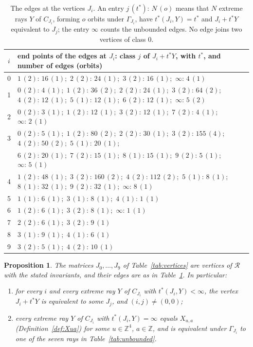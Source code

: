 \documentclass[11pt,reqno]{amsart}
\renewcommand{\_}{\origunderscore\allowbreak}
\numberwithin{equation}{section}
\theoremstyle{plain}
\newtheorem{prop}[thm]{Proposition}
\theoremstyle{definition}
\theoremstyle{remark}
\newcommand{\Z}{\mathbb{Z}}
\newcommand{\Rk}{\mathcal{R}}
\begin{document}
\begin{table}[t]
\centering
\small
\renewcommand{\arraystretch}{1.2}
\begin{tabular}{@{}c l@{}}
\toprule
$i$ & end points of the edges at $J_i$: class $j$ of $J_i+t^*Y$, with $t^*$, and number of edges (orbits)\\
\midrule
0 & $1\,(2){:}\,16\,(1)$;\ $2\,(2){:}\,24\,(1)$;\ $3\,(2){:}\,16\,(1)$;\ $\infty{:}\,4\,(1)$\\
1 & $0\,(2){:}\,4\,(1)$;\ $1\,(2){:}\,36\,(2)$;\ $2\,(2){:}\,24\,(1)$;\ $3\,(2){:}\,64\,(2)$;\ $4\,(2){:}\,12\,(1)$;\ $5\,(1){:}\,12\,(1)$;\ $6\,(2){:}\,12\,(1)$;\ $\infty{:}\,5\,(2)$\\
2 & $0\,(2){:}\,3\,(1)$;\ $1\,(2){:}\,12\,(1)$;\ $3\,(2){:}\,12\,(1)$;\ $7\,(2){:}\,4\,(1)$;\ $\infty{:}\,2\,(1)$\\
3 & $0\,(2){:}\,5\,(1)$;\ $1\,(2){:}\,80\,(2)$;\ $2\,(2){:}\,30\,(1)$;\ $3\,(2){:}\,155\,(4)$;\ $4\,(2){:}\,50\,(2)$;\ $5\,(1){:}\,20\,(1)$;\\
  & $6\,(2){:}\,20\,(1)$;\ $7\,(2){:}\,15\,(1)$;\ $8\,(1){:}\,15\,(1)$;\ $9\,(2){:}\,5\,(1)$;\ $\infty{:}\,5\,(1)$\\
4 & $1\,(2){:}\,48\,(1)$;\ $3\,(2){:}\,160\,(2)$;\ $4\,(2){:}\,112\,(2)$;\ $5\,(1){:}\,8\,(1)$;\ $8\,(1){:}\,32\,(1)$;\ $9\,(2){:}\,32\,(1)$;\ $\infty{:}\,8\,(1)$\\
5 & $1\,(1){:}\,6\,(1)$;\ $3\,(1){:}\,8\,(1)$;\ $4\,(1){:}\,1\,(1)$\\
6 & $1\,(2){:}\,6\,(1)$;\ $3\,(2){:}\,8\,(1)$;\ $\infty{:}\,1\,(1)$\\
7 & $2\,(2){:}\,6\,(1)$;\ $3\,(2){:}\,9\,(1)$\\
8 & $3\,(1){:}\,9\,(1)$;\ $4\,(1){:}\,6\,(1)$\\
9 & $3\,(2){:}\,5\,(1)$;\ $4\,(2){:}\,10\,(1)$\\
\bottomrule
\end{tabular}
\caption{The edges at the vertices $J_i$. An entry $j\,(t^*){:}\,N\,(o)$ means that $N$ extreme rays $Y$ of $C_{J_i}$, forming $o$ orbits under $\Gamma_{J_i}$, have $t^*(J_i,Y)=t^*$ and $J_i+t^*Y$ equivalent to $J_j$; the entry $\infty$ counts the unbounded edges. No edge joins two vertices of class $0$.}
\label{tab:edges}
\end{table}

\begin{prop}\label{prop:computation}
The matrices $J_0,\dots,J_9$ of Table~\ref{tab:vertices} are vertices of $\Rk$ with the stated invariants, and their edges are as in Table~\ref{tab:edges}. In particular:
\begin{enumerate}
\item for every $i$ and every extreme ray $Y$ of $C_{J_i}$ with $t^*(J_i,Y)<\infty$, the vertex $J_i+t^*Y$ is equivalent to some $J_j$, and $(i,j)\ne(0,0)$;
\item every extreme ray $Y$ of $C_{J_i}$ with $t^*(J_i,Y)=\infty$ equals $X_{u,a}$ (Definition~\ref{def:Xua}) for some $u\in\Z^4$, $a\in\Z$, and is equivalent under $\Gamma_{J_i}$ to one of the seven rays in Table~\ref{tab:unbounded}.
\end{enumerate}
\end{prop}
\end{document}
